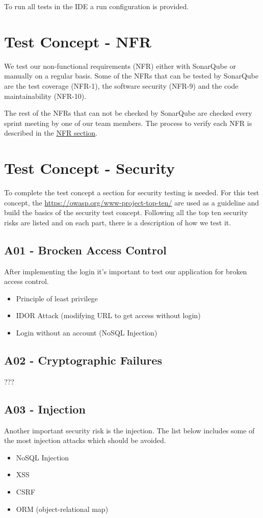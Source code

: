 To run all tests in the IDE a run configuration is provided.


\section{Test Concept - NFR}
We test our non-functional requirements (NFR) either with SonarQube or manually on a regular basis. Some of the NFRs that can be tested by SonarQube are the test coverage (NFR-1), the software security (NFR-9) and the code maintainability (NFR-10).

The rest of the NFRs that can not be checked by SonarQube are checked every sprint meeting by one of our team members.
The process to verify each NFR is described in the \hyperref[non-functional-requirements]{NFR section}.

\section{Test Concept - Security}
To complete the test concept a section for security testing is needed. For this test concept, the \href{OWASP Top Ten}{https://owasp.org/www-project-top-ten/} are used as a guideline and build the basics of the security test concept.
Following all the top ten security risks are listed and on each part, there is a description of how we test it.

\subsection{A01 - Brocken Access Control}
After implementing the login it's important to test our application for broken access control.

\begin{itemize}
  \item Principle of least privilege
  \item IDOR Attack (modifying URL to get access without login)
  \item Login without an account (NoSQL Injection)
\end{itemize}

\subsection{A02 - Cryptographic Failures}
???

\subsection{A03 - Injection}
Another important security risk is the injection. The list below includes some of the most injection attacks which should be avoided.
\begin{itemize}
  \item NoSQL Injection
  \item XSS
  \item CSRF
  \item ORM (object-relational map)
\end{itemize}

